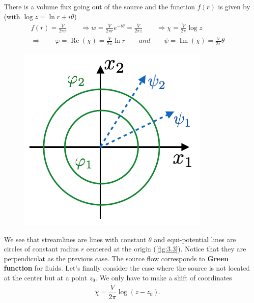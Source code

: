 		There is a volume flux going out of the source and the function $f(r)$ is given by (with $\log z = \ln r + i\theta$)
		\begin{equation}
		\begin{aligned}
			f(r) = \frac{\dot{V}}{2\pi r} \qquad \Rightarrow w = \frac{\dot{V}}{2\pi r}e^{-i\theta} = \frac{\dot{V}}{2\pi z} \qquad \Rightarrow \chi = \frac{\dot{V}}{2\pi}\log z\\
			\Rightarrow \qquad \varphi = \operatorname{Re}(\chi ) = \frac{\dot{V}}{2\pi}\ln r \qquad and \qquad \psi = \operatorname{Im}(\chi ) = \frac{\dot{V}}{2\pi} \theta
		\end{aligned}
		\end{equation}		 
		\newpage
		\begin{figure}
		\vspace{-1mm}
		\includegraphics[scale=0.5]{ch3/3}
		\label{fig:3.3}
		\end{figure}
		We see that streamlines are lines with constant $\theta$ and equi-potential lines are circles of constant radius $r$ centered at the origin (\autoref{fig:3.3}). Notice that they are perpendiculat as the previous case. The source flow corresponds to \textbf{Green function} for fluids. Let's finally consider the case where the source is not located at the center but at a point $z_0$. We only have to make a shift of coordinates 
		\begin{equation}
			\chi = \frac{\dot{V}}{2\pi}\log (z-z_0).
		\end{equation}
		
